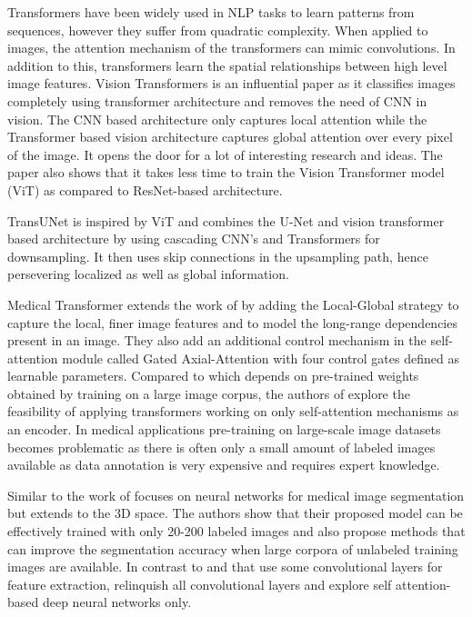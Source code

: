 \par
Transformers have been widely used in NLP tasks to learn patterns from sequences, however they suffer from quadratic complexity. When applied to images, the attention mechanism of the transformers can mimic convolutions. In addition to this, transformers learn the spatial relationships between high level image features. Vision Transformers \citep{transformers-2020-dosovitskiy} is an influential paper as it classifies images completely using transformer architecture and removes the need of CNN in vision. The CNN based architecture only captures local attention while the Transformer based vision architecture captures global attention over every pixel of the image.  It opens the door for a lot of interesting research and ideas. The paper also shows that it takes less time to train the Vision Transformer model (ViT) as compared to ResNet-based architecture.

\par
TransUNet \citep{transunet-2021-chen} is inspired by ViT \citep{transformers-2020-dosovitskiy} and combines the U-Net and vision transformer based architecture by using cascading CNN’s and Transformers for downsampling. It then uses skip connections in the upsampling path, hence persevering localized as well as global information.

\par
Medical Transformer \citep{medical_transformer-2021-valanarasu} extends the work of \citep{transformers-2020-dosovitskiy} by adding the Local-Global strategy to capture the local, finer image features and to model the long-range  dependencies present in an image. They also add an additional control mechanism in the self-attention module called Gated Axial-Attention with four control gates defined as learnable parameters. Compared to \citep{transunet-2021-chen} which depends on pre-trained weights obtained by training on a large image corpus, the authors of \citep{medical_transformer-2021-valanarasu} explore the feasibility of applying transformers working on only self-attention mechanisms as an encoder. In medical applications pre-training on large-scale image datasets becomes problematic as there is often only a small amount of labeled images available as data annotation is very expensive and requires expert knowledge.

\par
Similar to \citep{medical_transformer-2021-valanarasu} the work of \citep{convolution_free-2021-karimi} focuses on neural networks for medical image segmentation but extends to the 3D space. The authors show that their proposed model can be effectively trained with only 20-200 labeled images and also propose methods that can improve the segmentation accuracy when large corpora of unlabeled training images are available. In contrast to \citep{medical_transformer-2021-valanarasu} and \citep{transformers-2020-dosovitskiy} that use some convolutional layers for feature extraction, \citep{convolution_free-2021-karimi} relinquish all convolutional layers and explore self attention-based deep neural networks only.


